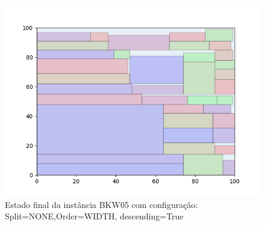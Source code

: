 \begin{figure}[H]
    \centering
    \caption[]{Estado final da instância BKW05 com configuração: Split=NONE,Order=WIDTH, descending=True}
    \label{fig:bkw05-none-width-true}
    \includegraphics[scale=0.5]{output/figures/bkw/bkw05/none/width/true/00}
\end{figure}
